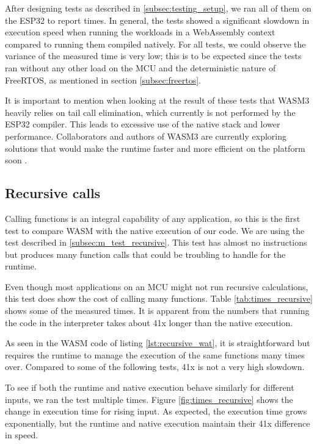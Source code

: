 After designing tests as described in \ref{subsec:testing_setup}, we ran all of them on the ESP32 to report times. In general, the tests showed a significant slowdown in execution speed when running the workloads in a WebAssembly context compared to running them compiled natively. For all tests, we could observe the variance of the measured time is very low; this is to be expected since the tests ran without any other load on the MCU and the deterministic nature of FreeRTOS, as mentioned in section \ref{subsec:freertos}.

It is important to mention when looking at the result of these tests that WASM3 heavily relies on tail call elimination, which currently is not performed by the ESP32 compiler. This leads to excessive use of the native stack and lower performance. Collaborators and authors of WASM3 are currently exploring solutions that would make the runtime faster and more efficient on the platform soon \autocite{grokhotkov_esp32-idf_nodate}.

\subsection{Recursive calls}\label{subsec:eval_recursive}

Calling functions is an integral capability of any application, so this is the first test to compare WASM with the native execution of our code. We are using the test described in \ref{subsec:m_test_recursive}. This test has almost no instructions but produces many function calls that could be troubling to handle for the runtime.

Even though most applications on an MCU might not run recursive calculations, this test does show the cost of calling many functions. Table \ref{tab:times_recursive} shows some of the measured times. It is apparent from the numbers that running the code in the interpreter takes about 41x longer than the native execution.

As seen in the WASM code of listing \ref{lst:recursive_wat}, it is straightforward but requires the runtime to manage the execution of the same functions many times over. Compared to some of the following tests, 41x is not a very high slowdown.

To see if both the runtime and native execution behave similarly for different inputs, we ran the test multiple times. Figure \ref{fig:times_recursive} shows the change in execution time for rising input. As expected, the execution time grows exponentially, but the runtime and native execution maintain their 41x difference in speed.

